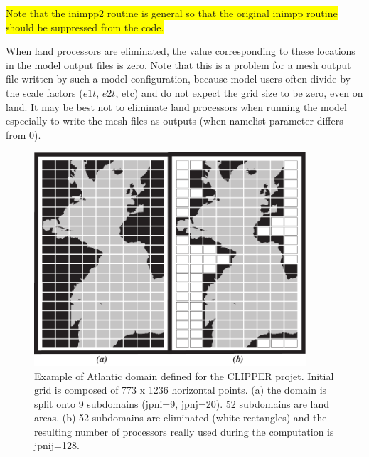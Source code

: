 \colorbox{yellow}{Note that the inimpp2 routine is general so that the original inimpp 
routine should be suppressed from the code.}

When land processors are eliminated, the value corresponding to these locations in 
the model output files is zero. Note that this is a problem for a mesh output file written 
by such a model configuration, because model users often divide by the scale factors 
($e1t$, $e2t$, etc) and do not expect the grid size to be zero, even on land. It may be 
best not to eliminate land processors when running the model especially to write the 
mesh files as outputs (when  namelist parameter differs from 0).

\begin{figure}[!ht]     \begin{center}
\includegraphics[width=0.90\textwidth]{./TexFiles/Figures/Fig_mppini2.pdf}
\caption {    \label{Fig_mppini2}
Example of Atlantic domain defined for the CLIPPER projet. Initial grid is 
composed of 773 x 1236 horizontal points. 
(a) the domain is split onto 9  subdomains (jpni=9, jpnj=20). 
52 subdomains are land areas. 
(b) 52 subdomains are eliminated (white rectangles) and the resulting number 
of processors really used during the computation is jpnij=128.}
\end{center}   \end{figure}


